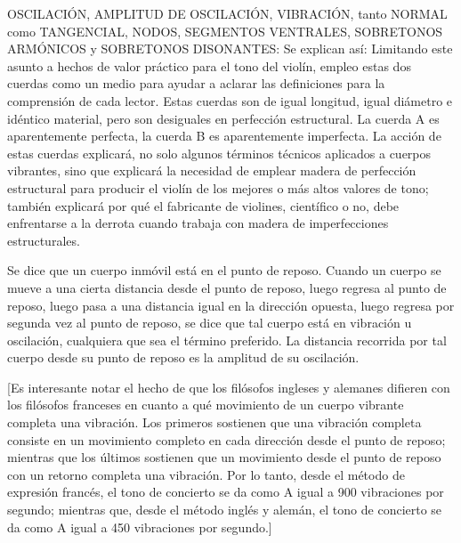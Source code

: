 \documentclass[12pt]{book}
\begin{document}
OSCILACIÓN, AMPLITUD DE OSCILACIÓN, VIBRACIÓN, tanto NORMAL como TANGENCIAL, NODOS, SEGMENTOS VENTRALES, SOBRETONOS ARMÓNICOS y SOBRETONOS DISONANTES: Se explican así: Limitando este asunto a hechos de valor práctico para el tono del violín, empleo estas dos cuerdas como un medio para ayudar a aclarar las definiciones para la comprensión de cada lector. Estas cuerdas son de igual longitud, igual diámetro e idéntico material, pero son desiguales en perfección estructural. La cuerda A es aparentemente perfecta, la cuerda B es aparentemente imperfecta. La acción de estas cuerdas explicará, no solo algunos términos técnicos aplicados a cuerpos vibrantes, sino que explicará la necesidad de emplear madera de perfección estructural para producir el violín de los mejores o más altos valores de tono; también explicará por qué el fabricante de violines, científico o no, debe enfrentarse a la derrota cuando trabaja con madera de imperfecciones estructurales.

Se dice que un cuerpo inmóvil está en el punto de reposo. Cuando un cuerpo se mueve a una cierta distancia desde el punto de reposo, luego regresa al punto de reposo, luego pasa a una distancia igual en la dirección opuesta, luego regresa por segunda vez al punto de reposo, se dice que tal cuerpo está en vibración u oscilación, cualquiera que sea el término preferido. La distancia recorrida por tal cuerpo desde su punto de reposo es la amplitud de su oscilación.

[Es interesante notar el hecho de que los filósofos ingleses y alemanes difieren con los filósofos franceses en cuanto a qué movimiento de un cuerpo vibrante completa una vibración. Los primeros sostienen que una vibración completa consiste en un movimiento completo en cada dirección desde el punto de reposo; mientras que los últimos sostienen que un movimiento desde el punto de reposo con un retorno completa una vibración. Por lo tanto, desde el método de expresión francés, el tono de concierto se da como A igual a 900 vibraciones por segundo; mientras que, desde el método inglés y alemán, el tono de concierto se da como A igual a 450 vibraciones por segundo.]
\end{document}
